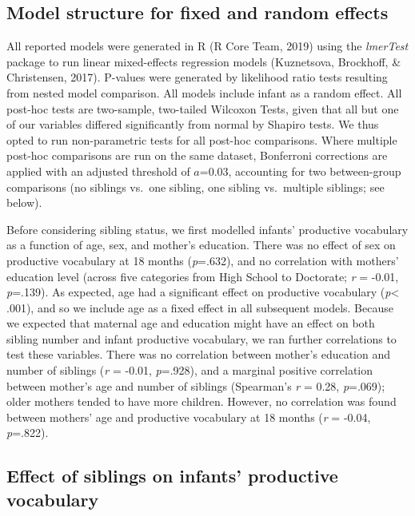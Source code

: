 \documentclass[
  english,
  man,floatsintext]{apa6}
\begin{document}
\hypertarget{model-structure-for-fixed-and-random-effects}{%
\subsection{Model structure for fixed and random effects}\label{model-structure-for-fixed-and-random-effects}}

All reported models were generated in R (R Core Team, 2019) using the \emph{lmerTest} package to run linear mixed-effects regression models (Kuznetsova, Brockhoff, \& Christensen, 2017). P-values were generated by likelihood ratio tests resulting from nested model comparison. All models include infant as a random effect. All post-hoc tests are two-sample, two-tailed Wilcoxon Tests, given that all but one of our variables differed significantly from normal by Shapiro tests. We thus opted to run non-parametric tests for all post-hoc comparisons. Where multiple post-hoc comparisons are run on the same dataset, Bonferroni corrections are applied with an adjusted threshold of \(a\)=0.03, accounting for two between-group comparisons (no siblings vs.~one sibling, one sibling vs.~multiple siblings; see below).

Before considering sibling status, we first modelled infants' productive vocabulary as a function of age, sex, and mother's education. There was no effect of sex on productive vocabulary at 18 months (\emph{p}=.632), and no correlation with mothers' education level (across five categories from High School to Doctorate; \emph{r} = -0.01, \emph{p}=.139). As expected, age had a significant effect on productive vocabulary (\emph{p}\textless{} .001), and so we include age as a fixed effect in all subsequent models. Because we expected that maternal age and education might have an effect on both sibling number and infant productive vocabulary, we ran further correlations to test these variables. There was no correlation between mother's education and number of siblings (\emph{r} = -0.01, \emph{p}=.928), and a marginal positive correlation between mother's age and number of siblings (Spearman's \emph{r} = 0.28, \emph{p}=.069); older mothers tended to have more children. However, no correlation was found between mothers' age and productive vocabulary at 18 months (\emph{r} = -0.04, \emph{p}=.822).

\hypertarget{effect-of-siblings-on-infants-productive-vocabulary}{%
\subsection{Effect of siblings on infants' productive vocabulary}\label{effect-of-siblings-on-infants-productive-vocabulary}}
\end{document}
